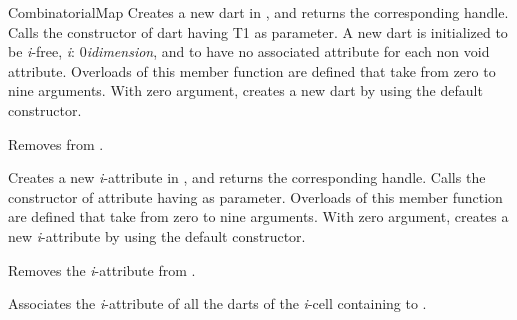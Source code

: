\begin{ccRefConcept}{CombinatorialMap}
  {Creates a new dart in , and returns the corresponding handle.
   Calls the constructor of dart having T1 as parameter.
   A new dart is initialized to be \emph{i}-free,
   \myforall{}\emph{i}: 0\myleq{}\emph{i}\myleq{}\emph{dimension}, and to have no associated 
   attribute for each non void attribute.
   Overloads of this member function are defined that take from zero to nine arguments.
   With zero argument,  creates a new dart by using the default constructor.
   }

   {Removes  from .}

  {Creates a new \emph{i}-attribute in , and returns the corresponding handle.
   Calls the constructor of attribute having  as parameter.
   Overloads of this member function are defined that take from zero to nine arguments.
   With zero argument,  creates a new \emph{i}-attribute by using the default constructor.
   }

	

{Removes the \emph{i}-attribute  from .
  }

   {Associates the \emph{i}-attribute of all the darts of the \emph{i}-cell 
     containing  to .
  }


\end{ccRefConcept}
